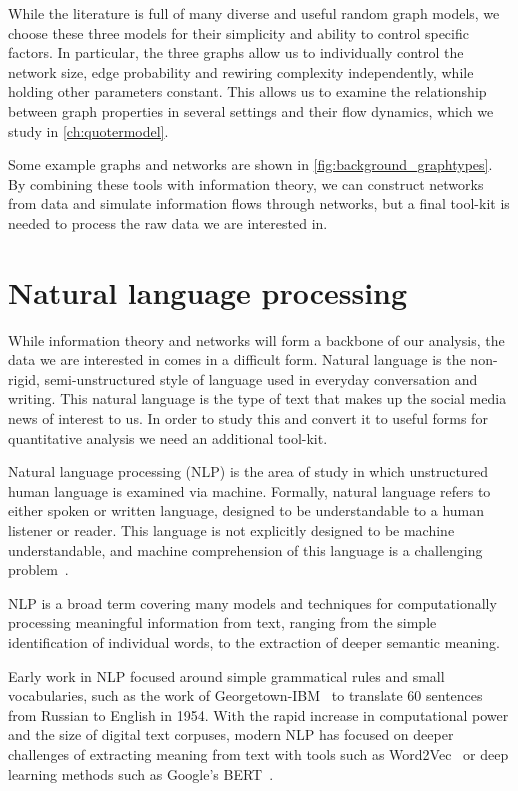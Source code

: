 While the literature is full of many diverse and useful random graph models, we choose these three models for their simplicity and ability to control specific factors. In particular, the three graphs allow us to individually control the network size, edge probability and rewiring complexity independently, while holding other parameters constant. This allows us to examine the relationship between graph properties in several settings and their flow dynamics, which we study in \autoref{ch:quotermodel}.

Some example graphs and networks are shown in \autoref{fig:background_graphtypes}. By combining these tools with information theory, we can construct networks from data and simulate information flows through networks, but a final tool-kit is needed to process the raw data we are interested in.


\section{Natural language processing}

While information theory and networks will form a backbone of our analysis, the data we are interested in comes in a difficult form. Natural language is the non-rigid, semi-unstructured style of language used in everyday conversation and writing. This natural language is the type of text that makes up the social media news of interest to us. In order to study this and convert it to useful forms for quantitative analysis we need an additional tool-kit.

Natural language processing (NLP) is the area of study in which unstructured human language is examined via machine. Formally, natural language refers to either spoken or written language, designed to be understandable to a human listener or reader. This language is not explicitly designed to be machine understandable, and machine comprehension of this language is a challenging problem~\cite{baeza-yates_challenges_2004}.

NLP is a broad term covering many models and techniques for computationally processing meaningful information from text, ranging from the simple identification of individual words, to the extraction of deeper semantic meaning. 

Early work in NLP focused around simple grammatical rules and small vocabularies, such as the work of Georgetown-IBM~\cite{hutchins_first_1997} to translate 60 sentences from Russian to English in 1954. With the rapid increase in computational power and the size of digital text corpuses, modern NLP has focused on deeper challenges of extracting meaning from text with tools such as Word2Vec~\cite{mikolov_distributed_2013, mikolov_efficient_2013} or deep learning methods such as Google's BERT~\cite{devlin_bert_2019}.

